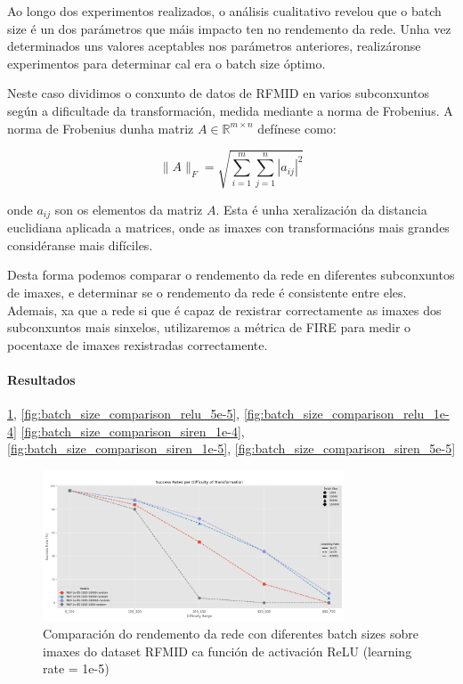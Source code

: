Ao longo dos experimentos realizados, o análisis cualitativo revelou que o batch size é un dos parámetros que máis impacto ten no rendemento da rede.
Unha vez determinados uns valores aceptables nos parámetros anteriores, realizáronse experimentos para determinar cal era o batch size óptimo.

Neste caso dividimos o conxunto de datos de RFMID en varios subconxuntos según a dificultade da transformación, medida mediante a norma de Frobenius.
A norma de Frobenius dunha matriz $A \in \mathbb{R}^{m \times n}$ defínese como:

\[
\|A\|_F = \sqrt{\sum_{i=1}^{m} \sum_{j=1}^{n} |a_{ij}|^2}
\]

onde $a_{ij}$ son os elementos da matriz $A$.
Esta é unha xeralización da distancia euclidiana aplicada a matrices, onde as imaxes con transformacións mais grandes considéranse mais difíciles.

Desta forma podemos comparar o rendemento da rede en diferentes subconxuntos de imaxes, e determinar se o rendemento da rede é consistente entre eles.
Ademais, xa que a rede si que é capaz de rexistrar correctamente as imaxes dos subconxuntos mais sinxelos, utilizaremos a métrica de FIRE para medir o pocentaxe de imaxes rexistradas correctamente.

\paragraph{Resultados}
\label{par:Resultados-batchsize}

\ref{fig:batch_size_comparison_relu_1e-5}, \ref{fig:batch_size_comparison_relu_5e-5}, \ref{fig:batch_size_comparison_relu_1e-4}
\ref{fig:batch_size_comparison_siren_1e-4}, \ref{fig:batch_size_comparison_siren_1e-5}, \ref{fig:batch_size_comparison_siren_5e-5}

\begin{figure}[ht] 
    \centering
    \includegraphics[width=0.8\textwidth]{imaxes/batchsize/experiment_plot_RFMID_MLP_1e-05.png}
    \caption{Comparación do rendemento da rede con diferentes batch sizes sobre imaxes do dataset RFMID ca función de activación ReLU (learning rate = 1e-5)}
    \label{fig:batch_size_comparison_relu_1e-5}
\end{figure}

